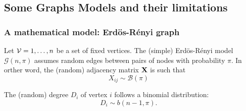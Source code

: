 \documentclass{beamer}\usepackage[]{graphicx}\usepackage[]{color}
\begin{document}
\subsection{Some Graphs Models and their limitations}

\begin{frame}
  \frametitle{A mathematical model: Erdös-Rényi graph}

  \begin{definition}
    Let $\mathcal{V} = {1,\dots,n}$ be a set of fixed vertices. The (simple) Erdös-Rényi model $\mathcal{G}(n,\pi)$ assumes random edges between pairs of nodes with probability $\pi$. In orther word, the (random) adjacency matrix $\mathbf{X}$ is such that
    \begin{equation*}
      X_{ij} \sim \mathcal{B}(\pi)
    \end{equation*}
  \end{definition}

  \vfill

  \begin{proposition}
    The (random) degree $D_i$ of vertex $i$ follows a binomial distribution:
      \begin{equation*}
        D_i \sim b(n-1, \pi).
      \end{equation*}
  \end{proposition}

\end{frame}
\end{document}
